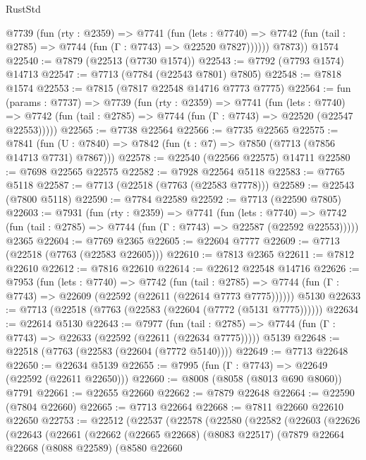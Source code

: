 \begin{lexlean}{RustStd}
\begin{coremodule}
          @7739
            (fun (rty : @2359) =>
            @7741
              (fun (lets : @7740) =>
              @7742 (fun (tail : @2785) => @7744 (fun (Γ : @7743) => @22520 @7827))))))
        @7873))
    @1574
@22540 := @7879 (@22513 (@7730 @1574))
@22543 := @7792 (@7793 @1574) @14713
@22547 := @7713 (@7784 (@22543 @7801) @7805)
@22548 := @7818 @1574
@22553 := @7815 (@7817 @22548 @14716 @7773 @7775)
@22564 := fun (params : @7737) =>
  @7739
    (fun (rty : @2359) =>
    @7741
      (fun (lets : @7740) =>
      @7742 (fun (tail : @2785) => @7744 (fun (Γ : @7743) => @22520 (@22547 @22553)))))
@22565 := @7738 @22564
@22566 := @7735 @22565
@22575 := @7841
    (fun (U : @7840) => @7842 (fun (t : @7) => @7850 (@7713 (@7856 @14713 @7731) @7867)))
@22578 := @22540 (@22566 @22575) @14711
@22580 := @7698 @22565 @22575
@22582 := @7928 @22564 @5118
@22583 := @7765 @5118
@22587 := @7713 (@22518 (@7763 (@22583 @7778)))
@22589 := @22543 (@7800 @5118)
@22590 := @7784 @22589
@22592 := @7713 (@22590 @7805)
@22603 := @7931
    (fun (rty : @2359) =>
    @7741
      (fun (lets : @7740) =>
      @7742 (fun (tail : @2785) => @7744 (fun (Γ : @7743) => @22587 (@22592 @22553)))))
    @2365
@22604 := @7769 @2365
@22605 := @22604 @7777
@22609 := @7713 (@22518 (@7763 (@22583 @22605)))
@22610 := @7813 @2365
@22611 := @7812 @22610
@22612 := @7816 @22610
@22614 := @22612 @22548 @14716
@22626 := @7953
    (fun (lets : @7740) =>
    @7742
      (fun (tail : @2785) =>
      @7744 (fun (Γ : @7743) => @22609 (@22592 (@22611 (@22614 @7773 @7775))))))
    @5130
@22633 := @7713 (@22518 (@7763 (@22583 (@22604 (@7772 (@5131 @7775))))))
@22634 := @22614 @5130
@22643 := @7977
    (fun (tail : @2785) => @7744 (fun (Γ : @7743) => @22633 (@22592 (@22611 (@22634 @7775)))))
    @5139
@22648 := @22518 (@7763 (@22583 (@22604 (@7772 @5140))))
@22649 := @7713 @22648
@22650 := @22634 @5139
@22655 := @7995 (fun (Γ : @7743) => @22649 (@22592 (@22611 @22650)))
@22660 := @8008 (@8058 (@8013 @690 @8060)) @7791
@22661 := @22655 @22660
@22662 := @7879 @22648
@22664 := @22590 (@7804 @22660)
@22665 := @7713 @22664
@22668 := @7811 @22660 @22610 @22650
@22753 := @22512
    (@22537
      (@22578
        (@22580
          (@22582
            (@22603
              (@22626
                (@22643
                  (@22661
                    (@22662
                      (@22665 @22668)
                      (@8083 @22517)
                      (@7879
                        @22664
                        @22668
                        (@8088 @22589)
                        (@8580
                          @22660

\end{coremodule}
\end{lexlean}
